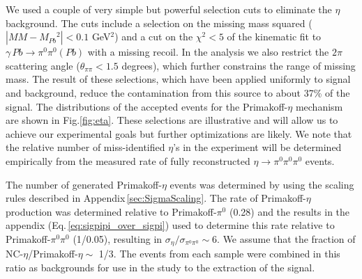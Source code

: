 We used a couple of very simple but powerful selection cuts to
eliminate the $\eta$ background. The cuts include a selection on the
missing mass squared ($|MM - M_{Pb}{^2}| < 0.1$ GeV$^2$) and a cut on
the $\chi^2 < 5$ of the kinematic fit to $\gamma\,Pb\rightarrow
\pi^0\pi^0 (Pb)$ with a missing recoil. In the analysis we also
restrict the $2\pi$ scattering angle ($\theta_{\pi\pi} <1.5$ degrees),
which further constrains the range of missing mass. The result of
these selections, which have been applied uniformly to signal and
background, reduce the contamination from this source to about 37\% of
the signal. The distributions of the accepted events for the
Primakoff-$\eta$ mechanism are shown in Fig.\ref{fig:eta}.  These
selections are illustrative and will allow us to achieve our
experimental goals but further optimizations are likely. We note that
the relative number of miss-identified $\eta$'s in the experiment will
be determined empirically from the measured rate of fully
reconstructed $\eta\rightarrow\pi^0\pi^0\pi^0$ events.

The number of generated Primakoff-$\eta$ events was determined by
using the scaling rules described in
Appendix\,\ref{sec:SigmaScaling}. The rate of Primakoff-$\eta$
production was determined relative to Primakoff-$\pi^0$ (0.28) and the
results in the appendix (Eq.\,\ref{eq:sigpipi_over_sigpi}) used to
determine this rate relative to Primakoff-$\pi^0\pi^0$ (1/0.05),
resulting in $\sigma_\eta/\sigma_{\pi^0\pi^0} \sim 6$. We assume that
the fraction of NC-$\eta$/Primakoff-$\eta \sim$ 1/3. The events from
each sample were combined in this ratio as backgrounds for use in the
study to the extraction of the signal.

